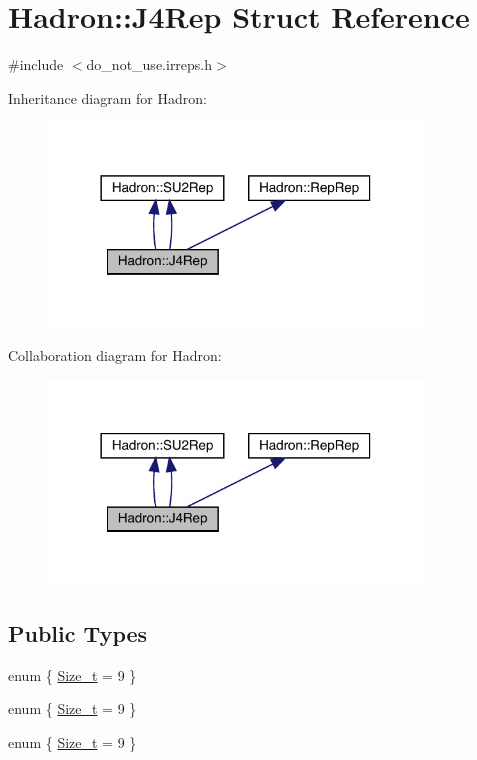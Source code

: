 \hypertarget{structHadron_1_1J4Rep}{}\section{Hadron\+:\+:J4\+Rep Struct Reference}
\label{structHadron_1_1J4Rep}


{\ttfamily \#include $<$do\+\_\+not\+\_\+use.\+irreps.\+h$>$}



Inheritance diagram for Hadron\+:\nopagebreak
\begin{figure}[H]
\begin{center}
\leavevmode
\includegraphics[width=282pt]{dd/d4f/structHadron_1_1J4Rep__inherit__graph}
\end{center}
\end{figure}


Collaboration diagram for Hadron\+:\nopagebreak
\begin{figure}[H]
\begin{center}
\leavevmode
\includegraphics[width=282pt]{db/df8/structHadron_1_1J4Rep__coll__graph}
\end{center}
\end{figure}
\subsection*{Public Types}
\begin{DoxyCompactItemize}
\item 
enum \{ \mbox{\hyperlink{structHadron_1_1J4Rep_ae15fa44ea367f60b5495d4dcdda1a8efa35f16a8e2fdabda918054d6b9eeedac6}{Size\+\_\+t}} = 9
 \}
\item 
enum \{ \mbox{\hyperlink{structHadron_1_1J4Rep_ae15fa44ea367f60b5495d4dcdda1a8efa35f16a8e2fdabda918054d6b9eeedac6}{Size\+\_\+t}} = 9
 \}
\item 
enum \{ \mbox{\hyperlink{structHadron_1_1J4Rep_ae15fa44ea367f60b5495d4dcdda1a8efa35f16a8e2fdabda918054d6b9eeedac6}{Size\+\_\+t}} = 9
 \}
\end{DoxyCompactItemize}
